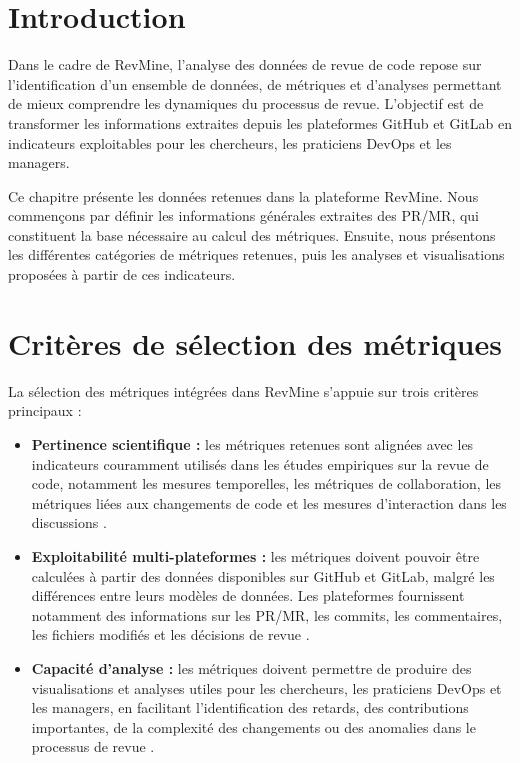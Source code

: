 \section{Introduction}

Dans le cadre de RevMine, l’analyse des données de revue de code repose sur l’identification d’un ensemble de données, de métriques et d’analyses permettant de mieux comprendre les dynamiques du processus de revue. L’objectif est de transformer les informations extraites depuis les plateformes GitHub et GitLab en indicateurs exploitables pour les chercheurs, les praticiens DevOps et les managers.

Ce chapitre présente les données retenues dans la plateforme RevMine. Nous commençons par définir les informations générales extraites des PR/MR, qui constituent la base nécessaire au calcul des métriques. Ensuite, nous présentons les différentes catégories de métriques retenues, puis les analyses et visualisations proposées à partir de ces indicateurs.


\section{Critères de sélection des métriques}

La sélection des métriques intégrées dans RevMine s’appuie sur trois critères principaux :

\begin{itemize}
    \item \textbf{Pertinence scientifique :} les métriques retenues sont alignées avec les indicateurs couramment utilisés dans les études empiriques sur la revue de code, notamment les mesures temporelles, les métriques de collaboration, les métriques liées aux changements de code et les mesures d’interaction dans les discussions \cite{chouchen2023reviewcompletion,bosu2014developerreputation,bavota2015four,rahman2017revhelper,turzo2023usefulcomments}.

    \item \textbf{Exploitabilité multi-plateformes :} les métriques doivent pouvoir être calculées à partir des données disponibles sur GitHub et GitLab, malgré les différences entre leurs modèles de données. Les plateformes fournissent notamment des informations sur les PR/MR, les commits, les commentaires, les fichiers modifiés et les décisions de revue \cite{kansab2025revmine,kansab2025devopsmr}.

    \item \textbf{Capacité d’analyse :} les métriques doivent permettre de produire des visualisations et analyses utiles pour les chercheurs, les praticiens DevOps et les managers, en facilitant l’identification des retards, des contributions importantes, de la complexité des changements ou des anomalies dans le processus de revue \cite{chouchen2023reviewcompletion,hassan2009predicting,kansab2025devopsmr}.
\end{itemize}

